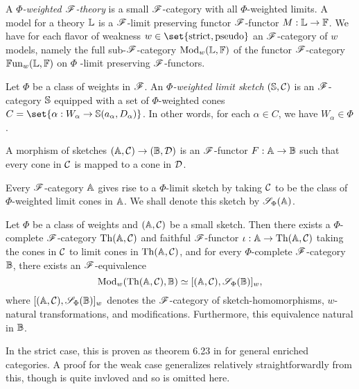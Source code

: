 \documentclass[../thesis.tex]{subfiles}
\begin{document}
\begin{definition}[Logic]
  A \emph{$\Phi$-weighted ${\mathscr{F}}$-theory} is a small ${\mathscr{F}}$-category with all $\Phi$-weighted limits. A model
  for a theory ${\mathbb{L}}$ is a ${\mathscr{F}}$-limit preserving functor ${\mathscr{F}}$-functor $M : {\mathbb{L}} \to {\mathbb{F}}$. We have for each
  flavor  of weakness $w \in \set{\text{strict}, \text{pseudo}}$ an ${\mathscr{F}}$-category of $w$ models, namely
  the full sub-${\mathscr{F}}$-category ${\mathrm{Mod}}_w({\mathbb{L}}, {\mathbb{F}})$ of the functor ${\mathscr{F}}$-category ${\mathbb{F}\mathrm{un}}_w({\mathbb{L}},{\mathbb{F}})$ on $\Phi$%
  -limit preserving ${\mathscr{F}}$-functors.
\end{definition}

\begin{definition}
  Let $\Phi$ be a class of weights in ${\mathscr{F}}$. An \emph{$\Phi$-weighted limit sketch} $({\mathbb{S}},{\mathcal{C}})$ is an
  ${\mathscr{F}}$-category ${\mathbb{S}}$ equipped with a set of $\Phi$-weighted cones $C = \set{\alpha : W_\alpha \to \bS(
  a_\alpha,D_\alpha)}$. In other words, for each $\alpha \in C$, we have $W_\alpha \in \Phi$.

  A morphism of sketches $({\mathbb{A}},{\mathcal{C}}) \to ({\mathbb{B}}, {\mathcal{D}})$ is an ${\mathscr{F}}$-functor $F : {\mathbb{A}} \to {\mathbb{B}}$ such that every
  cone in ${\mathcal{C}}$ is mapped to a cone in ${\mathcal{D}}$.
\end{definition}

Every ${\mathscr{F}}$-category ${\mathbb{A}}$ gives rise to a $\Phi$-limit sketch by taking ${\mathcal{C}}$ to be the class of
$\Phi$-weighted limit cones in ${\mathbb{A}}$. We shall denote this sketch by ${\mathscr{S}}_\Phi({\mathbb{A}})$.

\begin{theorem}
  Let $\Phi$ be a class of weights and $({\mathbb{A}},{\mathcal{C}})$ be a small sketch. Then there exists a $\Phi$-complete
  ${\mathscr{F}}$-category ${\mathrm{Th}}({\mathbb{A}},{\mathcal{C}})$ and faithful ${\mathscr{F}}$-functor $\iota : {\mathbb{A}} \to {\mathrm{Th}}({\mathbb{A}},{\mathcal{C}})$ taking the cones
  in ${\mathcal{C}}$ to limit cones in ${\mathrm{Th}}({\mathbb{A}},{\mathcal{C}})$, and for every $\Phi$-complete ${\mathscr{F}}$-category ${\mathbb{B}}$, there exists
  an ${\mathscr{F}}$-equivalence
  \[{\mathrm{Mod}}_w({\mathrm{Th}}({\mathbb{A}},{\mathcal{C}}),{\mathbb{B}}) \simeq [({\mathbb{A}},{\mathcal{C}}), {\mathscr{S}}_\Phi({\mathbb{B}})]_w,\]
  where $[({\mathbb{A}},{\mathcal{C}}), {\mathscr{S}}_\Phi({\mathbb{B}})]_w$ denotes the ${\mathscr{F}}$-category of sketch-homomorphisms, $w$-natural
  transformations, and modifications. Furthermore, this equivalence natural in ${\mathbb{B}}$.
\end{theorem}
\begin{remark}
  In the strict case, this is proven as theorem 6.23 in \cite{kelly1982a} for general enriched categories.
  A proof for the weak case generalizes relatively straightforwardly from this, though is quite invloved
  and so is omitted here.
\end{remark}
\end{document}
